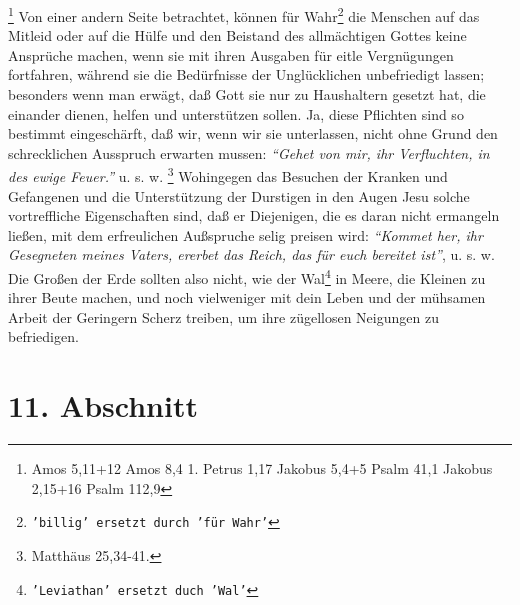 \footnote{
Amos 5,11+12
Amos 8,4
1. Petrus 1,17
Jakobus 5,4+5
Psalm 41,1
Jakobus 2,15+16
Psalm 112,9}
Von einer andern Seite
betrachtet, können für Wahr\footnote{\texttt{'billig' ersetzt durch 'für Wahr'}}
die Menschen auf das Mitleid oder auf die Hülfe und
den Beistand des allmächtigen Gottes keine Ansprüche machen, wenn sie mit ihren
Ausgaben für eitle Vergnügungen fortfahren, während sie die Bedürfnisse der
Unglücklichen unbefriedigt lassen; besonders wenn man erwägt, daß Gott sie nur
zu Haushaltern gesetzt hat, die einander dienen, helfen und unterstützen sollen.
Ja, diese Pflichten sind so bestimmt eingeschärft, daß wir, wenn wir sie
unterlassen, nicht ohne Grund den schrecklichen Ausspruch erwarten mussen:
\textit{"`Gehet von mir, ihr Verfluchten, in des ewige
Feuer."'} u. s. w.
\footnote{Matthäus 25,34-41.}
Wohingegen das Besuchen der Kranken und Gefangenen und die
Unterstützung der Durstigen in den Augen Jesu solche vortreffliche Eigenschaften
sind, daß er Diejenigen, die es daran nicht ermangeln ließen, mit dem
erfreulichen Außspruche selig preisen wird:
\textit{"`Kommet her, ihr Gesegneten meines
Vaters, ererbet das Reich, das für euch bereitet ist"'}, u. s. w. Die Großen der
Erde sollten also nicht, wie der Wal\footnote{\texttt{'Leviathan' ersetzt duch
'Wal'}} in Meere, die Kleinen zu ihrer Beute
machen, und noch vielweniger mit dein Leben und der mühsamen Arbeit der
Geringern Scherz treiben, um ihre zügellosen Neigungen zu befriedigen.

\section{11. Abschnitt} \label{kap18_ab11}

